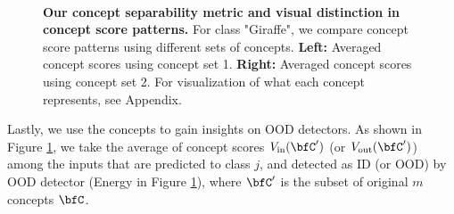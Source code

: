 \begin{figure}[bt]
\centering
{}\hfill
{}\hfill\\
\vspace{-2mm}
\hfill
{}
\caption{\small \textbf{Our concept separability metric and visual distinction in concept score patterns.} For class "Giraffe", we compare concept score patterns using different sets of concepts. \textbf{Left:} Averaged concept scores using concept set 1. \textbf{Right:} Averaged concept scores using concept set 2. For visualization of what each concept represents, see Appendix.}
\label{fig:high_separa_interpretatbility}
\end{figure}
Lastly, we use the concepts to gain insights on OOD detectors.
As shown in Figure \ref{fig:high_separa_interpretatbility}, we take the average of concept scores $V_{\textrm{in}}(\bfC')$ (or $V_{\textrm{out}}(\bfC')$) among the inputs that are predicted to class $j$, and detected as ID (or OOD) by OOD detector (\eg Energy in Figure \ref{fig:high_separa_interpretatbility}), where $\bfC'$ is the subset of original $m$ concepts $\bfC$. 
